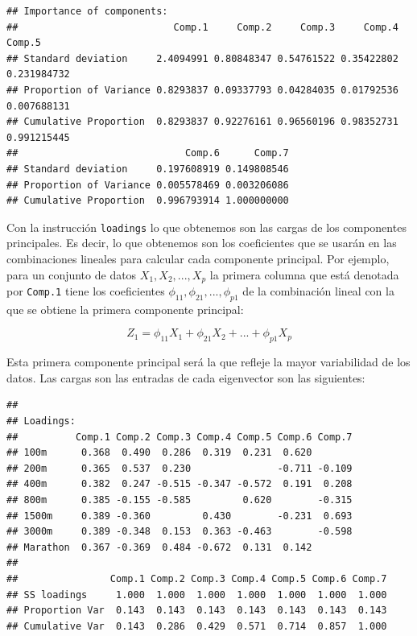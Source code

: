 \documentclass[
]{book}
\newenvironment{Shaded}{\begin{snugshade}}{\end{snugshade}}
\newcommand{\NormalTok}[1]{#1}
\newcommand{\SpecialCharTok}[1]{\textcolor[rgb]{0.81,0.36,0.00}{\textbf{#1}}}
\begin{document}
\begin{verbatim}
## Importance of components:
##                           Comp.1     Comp.2     Comp.3     Comp.4      Comp.5
## Standard deviation     2.4094991 0.80848347 0.54761522 0.35422802 0.231984732
## Proportion of Variance 0.8293837 0.09337793 0.04284035 0.01792536 0.007688131
## Cumulative Proportion  0.8293837 0.92276161 0.96560196 0.98352731 0.991215445
##                             Comp.6      Comp.7
## Standard deviation     0.197608919 0.149808546
## Proportion of Variance 0.005578469 0.003206086
## Cumulative Proportion  0.996793914 1.000000000
\end{verbatim}

Con la instrucción \texttt{loadings} lo que obtenemos son las cargas de los componentes principales. Es decir, lo que obtenemos son los coeficientes que se usarán en las combinaciones lineales para calcular cada componente principal. Por ejemplo, para un conjunto de datos \(X_1, X_2,..., X_p\) la primera columna que está denotada por \texttt{Comp.1} tiene los coeficientes \(\phi_{11}, \phi_{21},... ,\phi_{p1}\) de la combinación lineal con la que se obtiene la primera componente principal:

\[Z_1=\phi_{11}X_1+\phi_{21}X_2+... +\phi_{p1}X_p\]

Esta primera componente principal será la que refleje la mayor variabilidad de los datos. Las cargas son las entradas de cada eigenvector son las siguientes:

\begin{Shaded}
\end{Shaded}

\begin{verbatim}
## 
## Loadings:
##          Comp.1 Comp.2 Comp.3 Comp.4 Comp.5 Comp.6 Comp.7
## 100m      0.368  0.490  0.286  0.319  0.231  0.620       
## 200m      0.365  0.537  0.230               -0.711 -0.109
## 400m      0.382  0.247 -0.515 -0.347 -0.572  0.191  0.208
## 800m      0.385 -0.155 -0.585         0.620        -0.315
## 1500m     0.389 -0.360         0.430        -0.231  0.693
## 3000m     0.389 -0.348  0.153  0.363 -0.463        -0.598
## Marathon  0.367 -0.369  0.484 -0.672  0.131  0.142       
## 
##                Comp.1 Comp.2 Comp.3 Comp.4 Comp.5 Comp.6 Comp.7
## SS loadings     1.000  1.000  1.000  1.000  1.000  1.000  1.000
## Proportion Var  0.143  0.143  0.143  0.143  0.143  0.143  0.143
## Cumulative Var  0.143  0.286  0.429  0.571  0.714  0.857  1.000
\end{verbatim}
\end{document}
